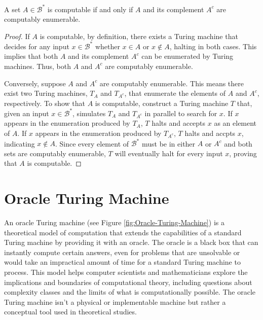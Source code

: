 \begin{proposition}
A set $A \in \mathcal{B}^\ast$ is computable if and only if $A$ and its complement $A^c$ are computably enumerable.
\end{proposition}
\begin{proof}
If $A$ is computable, by definition, there exists a Turing machine that decides for any input $x \in \mathcal{B}^\ast$ whether $x \in A$ or $x \notin A$, halting in both cases. This implies that both $A$ and its complement $A^c$ can be enumerated by Turing machines. Thus, both $A$ and $A^c$ are computably enumerable.

Conversely, suppose $A$ and $A^c$ are computably enumerable. This means there exist two Turing machines, $T_A$ and $T_{A^c}$, that enumerate the elements of $A$ and $A^c$, respectively. To show that $A$ is computable, construct a Turing machine $T$ that, given an input $x \in \mathcal{B}^\ast$, simulates $T_A$ and $T_{A^c}$ in parallel to search for $x$. If $x$ appears in the enumeration produced by $T_A$, $T$ halts and accepts $x$ as an element of $A$. If $x$ appears in the enumeration produced by $T_{A^c}$, $T$ halts and accpts $x$, indicating $x \notin A$. Since every element of $\mathcal{B}^\ast$ must be in either $A$ or $A^c$ and both sets are computably enumerable, $T$ will eventually halt for every input $x$, proving that $A$ is computable.
\end{proof}

%
%

\section{Oracle Turing Machine}
\label{sec:oracle_turing_machine}

An oracle Turing machine (see Figure \ref{fig:Oracle-Turing-Machine}) is a theoretical model of computation that extends the capabilities of a standard Turing machine by providing it with an oracle. The oracle is a black box that can instantly compute certain answers, even for problems that are unsolvable or would take an impractical amount of time for a standard Turing machine to process. This model helps computer scientists and mathematicians explore the implications and boundaries of computational theory, including questions about complexity classes and the limits of what is computationally possible. The oracle Turing machine isn't a physical or implementable machine but rather a conceptual tool used in theoretical studies.

